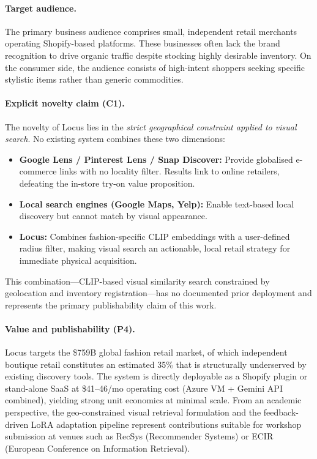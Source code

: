 \documentclass[12pt]{article}
\begin{document}
\paragraph{Target audience.}
The primary business audience comprises small, independent retail merchants operating Shopify-based platforms. These businesses often lack the brand recognition to drive organic traffic despite stocking highly desirable inventory. On the consumer side, the audience consists of high-intent shoppers seeking specific stylistic items rather than generic commodities.

\paragraph{Explicit novelty claim (C1).}
The novelty of Locus lies in the \emph{strict geographical constraint applied to visual search}. No existing system combines these two dimensions:

\begin{itemize}[leftmargin=*]
    \item \textbf{Google Lens / Pinterest Lens / Snap Discover:} Provide globalised e-commerce links with no locality filter. Results link to online retailers, defeating the in-store try-on value proposition.
    \item \textbf{Local search engines (Google Maps, Yelp):} Enable text-based local discovery but cannot match by visual appearance.
    \item \textbf{Locus:} Combines fashion-specific CLIP embeddings with a user-defined radius filter, making visual search an actionable, local retail strategy for immediate physical acquisition.
\end{itemize}

This combination---CLIP-based visual similarity search constrained by geolocation and inventory registration---has no documented prior deployment and represents the primary publishability claim of this work.

\paragraph{Value and publishability (P4).}
Locus targets the \$759B global fashion retail market, of which independent boutique retail constitutes an estimated 35\% that is structurally underserved by existing discovery tools. The system is directly deployable as a Shopify plugin or stand-alone SaaS at \$41--46/mo operating cost (Azure VM + Gemini API combined), yielding strong unit economics at minimal scale. From an academic perspective, the geo-constrained visual retrieval formulation and the feedback-driven LoRA adaptation pipeline represent contributions suitable for workshop submission at venues such as RecSys (Recommender Systems) or ECIR (European Conference on Information Retrieval).
\end{document}
